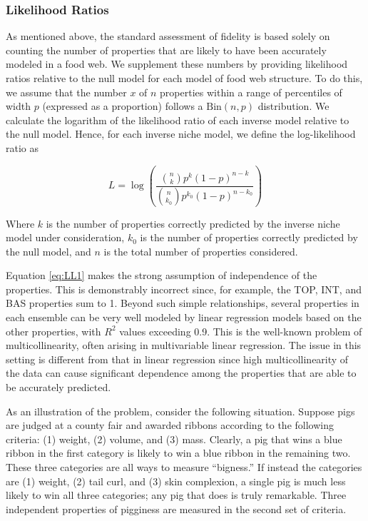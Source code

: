 \documentclass[/home/nkappler/Research/Dissertation/
 dissertation.tex]{subfiles}
\begin{document}
\begin{bibunit}
\subsubsection{Likelihood Ratios}

As mentioned above, the standard assessment of fidelity is based solely on
counting the number of properties that are likely to have been accurately
modeled in a food web. We supplement these numbers by providing likelihood
ratios relative to the null model for each model of food web structure. To do
this, we assume that the number $x$ of $n$ properties within a range of
percentiles of width $p$ (expressed as a proportion) follows a
$\text{Bin}(n,p)$ distribution. We calculate the logarithm of the likelihood
ratio of each inverse model relative to the null model. Hence, for each inverse
niche model, we define the log-likelihood ratio as 

\begin{equation}
    L =
    \log\left(\frac{\binom{n}{k}p^k(1-p)^{n-k}}{\binom{n}{k_0}p^{k_0}(1-p)^{n-k_0}}\right)\label{eq:LL1}
\end{equation}

Where $k$ is the number of properties correctly predicted by the inverse niche
model under consideration, $k_0$ is the number of properties correctly
predicted by the null model, and $n$ is the total number of properties
considered.

Equation \ref{eq:LL1} makes the strong assumption of independence of the
properties. This is demonstrably incorrect since, for example, the TOP,
INT, and BAS properties sum to 1. Beyond such simple relationships, several
properties in each ensemble can be very well modeled by linear regression
models based on the other properties, with $R^2$ values exceeding 0.9. This is
the well-known problem of multicollinearity, often arising in multivariable
linear regression. The issue in this setting is different from that in linear
regression since high multicollinearity of the data can cause significant
dependence among the properties that are able to be accurately predicted.

As an illustration of the problem, consider the following situation.
Suppose pigs are judged at a county fair and awarded ribbons according to the
following criteria: (1) weight, (2) volume, and (3) mass.
Clearly, a pig that wins a blue ribbon in the first category is likely to win a
blue ribbon in the remaining two. These three categories are all ways to
measure ``bigness.'' If instead the categories are (1) weight, (2) tail curl,
and (3) skin complexion, a single pig is much less likely to win all three
categories; any pig that does is truly remarkable. Three independent  
properties of pigginess are measured in the second set of criteria.


\end{bibunit}
\end{document}
